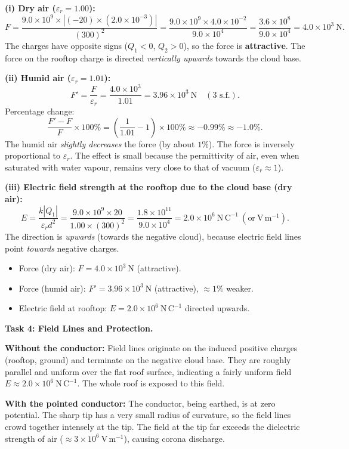 \documentclass[11pt]{article}
\begin{document}
\textbf{(i) Dry air ($\varepsilon_r = 1.00$):}
\[
F = \frac{9.0\times 10^{9}\times |(-20)\times (2.0\times 10^{-3})|}{(300)^2}
= \frac{9.0\times 10^{9}\times 4.0\times 10^{-2}}{9.0\times 10^{4}}
= \frac{3.6\times 10^{8}}{9.0\times 10^{4}}
= 4.0\times 10^{3}\ \mathrm{N}.
\]
The charges have opposite signs ($Q_1<0$, $Q_2>0$), so the force is \textbf{attractive}. The force on the rooftop charge is directed \emph{vertically upwards} towards the cloud base.

\textbf{(ii) Humid air ($\varepsilon_r = 1.01$):}
\[
F' = \frac{F}{\varepsilon_r} = \frac{4.0\times 10^{3}}{1.01} = 3.96\times 10^{3}\ \mathrm{N}\quad(\text{3 s.f.}).
\]
Percentage change:
\[
\frac{F' - F}{F}\times 100\% = \left(\frac{1}{1.01} - 1\right)\times 100\% \approx -0.99\% \approx -1.0\%.
\]
The humid air \emph{slightly decreases} the force (by about $1\%$). The force is inversely proportional to $\varepsilon_r$. The effect is small because the permittivity of air, even when saturated with water vapour, remains very close to that of vacuum ($\varepsilon_r \approx 1$).

\textbf{(iii) Electric field strength at the rooftop due to the cloud base (dry air):}
\[
E = \frac{k|Q_1|}{\varepsilon_r d^2} = \frac{9.0\times 10^{9}\times 20}{1.00 \times (300)^2}
= \frac{1.8\times 10^{11}}{9.0\times 10^{4}}
= 2.0\times 10^{6}\ \mathrm{N\,C^{-1}}\ (\text{or}\ \mathrm{V\,m^{-1}}).
\]
The direction is \emph{upwards} (towards the negative cloud), because electric field lines point \emph{towards} negative charges.

\begin{aretenir}
\begin{itemize}
\item Force (dry air): $F = 4.0\times 10^{3}\ \mathrm{N}$ (attractive).
\item Force (humid air): $F' = 3.96\times 10^{3}\ \mathrm{N}$ (attractive), $\approx 1\%$ weaker.
\item Electric field at rooftop: $E = 2.0\times 10^{6}\ \mathrm{N\,C^{-1}}$ directed upwards.
\end{itemize}
\end{aretenir}

\textbf{Task 4: Field Lines and Protection.}

\begin{experience}
\textbf{Without the conductor:} Field lines originate on the induced positive charges (rooftop, ground) and terminate on the negative cloud base. They are roughly parallel and uniform over the flat roof surface, indicating a fairly uniform field $E \approx 2.0\times 10^{6}\ \mathrm{N\,C^{-1}}$. The whole roof is exposed to this field.

\textbf{With the pointed conductor:} The conductor, being earthed, is at zero potential. The sharp tip has a very small radius of curvature, so the field lines crowd together intensely at the tip. The field at the tip far exceeds the dielectric strength of air ($\approx 3\times 10^{6}\ \mathrm{V\,m^{-1}}$), causing corona discharge.
\end{experience}
\end{document}
